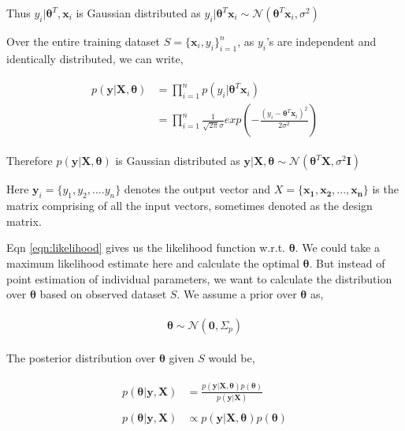 \documentclass[english]{tktltiki}
\begin{document}
Thus $y_i|\boldsymbol\theta ^T, \mathbf{x}_i$ is Gaussian distributed as $y_i | \boldsymbol\theta ^T \mathbf{x}_i \sim \mathcal{N}(\boldsymbol\theta^T \mathbf{x}_i, \sigma^2)
$

Over the entire training dataset $S = \{\mathbf{x}_i, y_i\}_{i=1}^n$, as $y_i$'s are independent and identically distributed, we can write,

\begin{eqnarray}
\label{eqn:likelihood}
\begin{split}
	p(\mathbf{y} | \mathbf{X}, \boldsymbol\theta) &= \prod_{i = 1}^n p(y_i | \boldsymbol\theta ^T \mathbf{x}_i) \\
	&= \prod_{i = 1}^n \frac{1}{\sqrt{2 \pi} \sigma} exp(-\frac{(y_i - \boldsymbol\theta ^T \mathbf{x}_i)^2}{2 \sigma^2}) 
\end{split}
\end{eqnarray}

Therefore $p(\mathbf{y} | \mathbf{X}, \boldsymbol\theta)$ is Gaussian distributed as $\mathbf{y} | \mathbf{X}, \boldsymbol\theta \sim \mathcal{N}(\boldsymbol\theta^T \mathbf{X}, \sigma^2 \mathbf{I})$

Here $\mathbf{y}_i = \{y_1, y_2, .... y_n\}$ denotes the output vector and $X = \{\mathbf{x_1}, \mathbf{x_2}, ..., \mathbf{x_n}\}$ is the matrix comprising of all the input vectors, sometimes denoted as the design matrix.



Eqn \ref{eqn:likelihood} gives us the likelihood function w.r.t. $\boldsymbol \theta$. We could take a maximum likelihood estimate here and calculate the optimal $\boldsymbol \theta$. But instead of point estimation of individual parameters, we want to calculate the distribution over $\boldsymbol \theta$ based on observed dataset $S$. We assume a prior over $\boldsymbol \theta$ as,

\begin{eqnarray}
\label{eqn:prior}
\begin{split}
	\boldsymbol \theta \sim \mathcal{N}(\mathbf{0}, \Sigma_p)
\end{split}
\end{eqnarray}

The posterior distribution over $\boldsymbol \theta$ given $S$ would be,

\begin{eqnarray}
\begin{split}
p(\boldsymbol \theta | \mathbf{y}, \mathbf{X}) &= \frac{p(\mathbf{y} | \mathbf{X}, \boldsymbol\theta) p(\boldsymbol \theta)}{p(\mathbf{y} | \mathbf{X})} \\
&~\\
p(\boldsymbol \theta | \mathbf{y}, \mathbf{X}) & \propto p(\mathbf{y} | \mathbf{X}, \boldsymbol\theta) p(\boldsymbol \theta)
\end{split}
\end{eqnarray}
\end{document}
